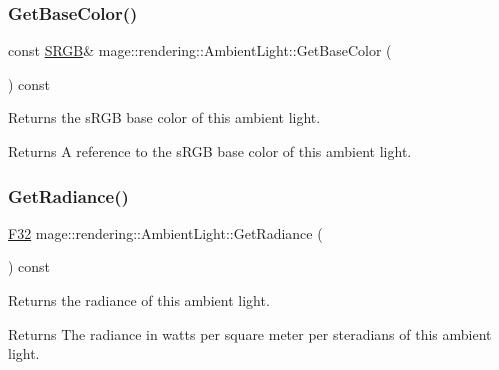 \subsubsection{\texorpdfstring{Get\+Base\+Color()}{GetBaseColor()}\hspace{0.1cm}{\footnotesize\ttfamily [2/2]}}
{\footnotesize\ttfamily const \hyperlink{structmage_1_1_s_r_g_b}{S\+R\+GB}\& mage\+::rendering\+::\+Ambient\+Light\+::\+Get\+Base\+Color (\begin{DoxyParamCaption}{ }\end{DoxyParamCaption}) const\hspace{0.3cm}{\ttfamily [noexcept]}}

Returns the s\+R\+GB base color of this ambient light.

\begin{DoxyReturn}{Returns}
A reference to the s\+R\+GB base color of this ambient light. 
\end{DoxyReturn}
\hypertarget{classmage_1_1rendering_1_1_ambient_light_ad78278e798956e1c3a707a37dfb052da}{}\label{classmage_1_1rendering_1_1_ambient_light_ad78278e798956e1c3a707a37dfb052da} 
\subsubsection{\texorpdfstring{Get\+Radiance()}{GetRadiance()}}
{\footnotesize\ttfamily \hyperlink{namespacemage_aa97e833b45f06d60a0a9c4fc22ae02c0}{F32} mage\+::rendering\+::\+Ambient\+Light\+::\+Get\+Radiance (\begin{DoxyParamCaption}{ }\end{DoxyParamCaption}) const\hspace{0.3cm}{\ttfamily [noexcept]}}

Returns the radiance of this ambient light.

\begin{DoxyReturn}{Returns}
The radiance in watts per square meter per steradians of this ambient light. 
\end{DoxyReturn}
\hypertarget{classmage_1_1rendering_1_1_ambient_light_a480e6b39d92266254778c23e8456e55e}{}\label{classmage_1_1rendering_1_1_ambient_light_a480e6b39d92266254778c23e8456e55e} 
